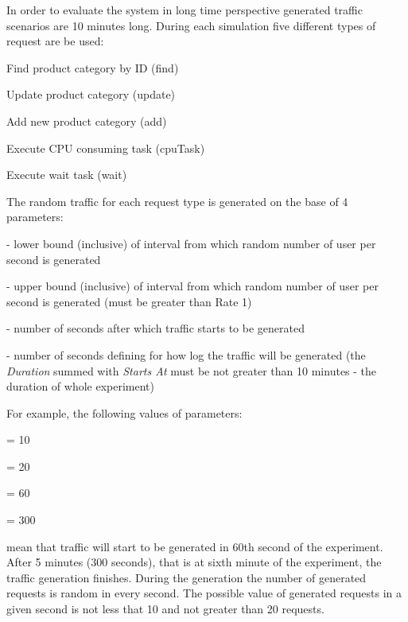 \documentclass[12pt,a4paper]{article}
\let\tempone\itemize
\let\temptwo\enditemize
\renewenvironment{itemize}{\tempone\addtolength{\itemsep}{-0.4\baselineskip}}{\temptwo}
\begin{document}
In order to evaluate the system in long time perspective generated traffic scenarios are 10 minutes long. 
During each simulation five different types of request are be used:
\begin{itemize}
\item Find product category by ID (find)
\item Update product	category (update)
\item Add new product category (add)
\item Execute CPU consuming task (cpuTask)
\item Execute wait task (wait)
\end{itemize}

The random traffic for each request type is generated on the base of 4 parameters:
\begin{itemize}
\item[\textit{Rate1}] - lower bound (inclusive) of interval from which random number of user per second is generated
\item[\textit{Rate2}] - upper bound (inclusive) of interval from which random number of user per second is generated  (must be greater than Rate 1)
\item[\textit{StartAt}] - number of seconds after which traffic starts to be generated
\item[\textit{Duration}] - number of seconds defining for how log the traffic will be generated (the \textit{Duration} summed with \textit{Starts At} must be not greater than 10 minutes - the duration of whole experiment)
\end{itemize}

For example, the following values of parameters:

\begin{center}
\begin{itemize}
\item[\textit{Rate1}] = 10
\item[\textit{Rate2}] = 20
\item[\textit{StartAt}] = 60
\item[\textit{Duration}] = 300
\end{itemize}
\end{center}

mean that traffic will start to be generated in 60th second of the experiment. After 5 minutes (300 seconds), that is at sixth minute of the experiment, the traffic generation finishes. During the generation the number of generated requests is random in every second. The possible value of generated requests in a given second is not less that 10 and not greater than 20 requests. 
\end{document}
